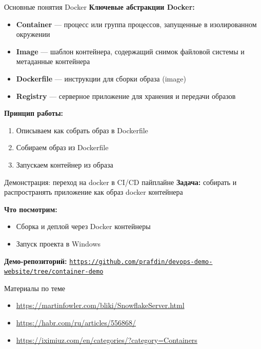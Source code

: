 \documentclass[aspectratio=169]{beamer}
\begin{document}
    \begin{frame}{Основные понятия Docker}
        \textbf{Ключевые абстракции Docker:}

        \begin{itemize}
            \item \textbf{Container} — процесс или группа процессов, запущенные в изолированном окружении
            \item \textbf{Image} — шаблон контейнера, содержащий снимок файловой системы и метаданные контейнера
            \item \textbf{Dockerfile} — инструкции для сборки образа (image)
            \item \textbf{Registry} — серверное приложение для хранения и передачи образов
        \end{itemize}

        \vspace{0.3cm}

        \textbf{Принцип работы:}
        \begin{enumerate}
            \item Описываем как собрать образ в Dockerfile
            \item Собираем образ из Dockerfile
            \item Запускаем контейнер из образа
        \end{enumerate}
    \end{frame}

    \begin{frame}{Демонстрация: переход на docker в CI/CD пайплайне}
        \textbf{Задача:} собирать и распространять приложение как образ docker контейнера

        \vspace{0.3cm}

        \textbf{Что посмотрим:}
        \begin{itemize}
            \item Сборка и деплой через Docker контейнеры
            \item Запуск проекта в Windows
        \end{itemize}

        \vspace{0.2cm}
        \textbf{Демо-репозиторий:}
        \href{https://github.com/prafdin/devops-demo-website/tree/container-demo}{\texttt{https://github.com/prafdin/devops-demo-website/tree/container-demo}}
    \end{frame}

    \begin{frame}{Материалы по теме}
        \begin{itemize}
            \item \url{https://martinfowler.com/bliki/SnowflakeServer.html}
            \item \url{https://habr.com/ru/articles/556868/}
            \item \url{https://iximiuz.com/en/categories/?category=Containers}
        \end{itemize}
    \end{frame}
\end{document}
